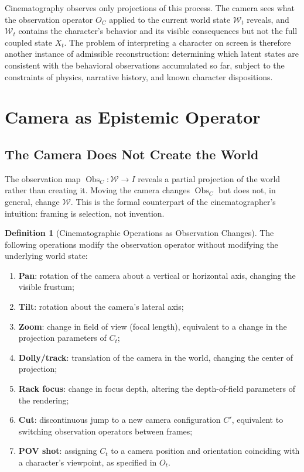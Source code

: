 \documentclass[11pt,a4paper]{article}
\theoremstyle{plain}
\theoremstyle{definition}
\newtheorem{definition}[theorem]{Definition}
\theoremstyle{remark}
\DeclareMathOperator{\Obs}{Obs}
\begin{document}
Cinematography observes only projections of this process. The camera sees what the observation operator $O_C$ applied to the current world state $\mathcal{W}_t$ reveals, and $\mathcal{W}_t$ contains the character's behavior and its visible consequences but not the full coupled state $X_t$. The problem of interpreting a character on screen is therefore another instance of admissible reconstruction: determining which latent states are consistent with the behavioral observations accumulated so far, subject to the constraints of physics, narrative history, and known character dispositions.


\section{Camera as Epistemic Operator}
\label{sec:camera}

\subsection{The Camera Does Not Create the World}

The observation map $\Obs_C : \mathcal{W} \to I$ reveals a partial projection of the world rather than creating it. Moving the camera changes $\Obs_C$ but does not, in general, change $\mathcal{W}$. This is the formal counterpart of the cinematographer's intuition: framing is selection, not invention.

\begin{definition}[Cinematographic Operations as Observation Changes]
The following operations modify the observation operator without modifying the underlying world state:
\begin{enumerate}[leftmargin=2em,itemsep=0pt]
\item \textbf{Pan}: rotation of the camera about a vertical or horizontal axis, changing the visible frustum;
\item \textbf{Tilt}: rotation about the camera's lateral axis;
\item \textbf{Zoom}: change in field of view (focal length), equivalent to a change in the projection parameters of $C_t$;
\item \textbf{Dolly/track}: translation of the camera in the world, changing the center of projection;
\item \textbf{Rack focus}: change in focus depth, altering the depth-of-field parameters of the rendering;
\item \textbf{Cut}: discontinuous jump to a new camera configuration $C'$, equivalent to switching observation operators between frames;
\item \textbf{POV shot}: assigning $C_t$ to a camera position and orientation coinciding with a character's viewpoint, as specified in $O_t$.
\end{enumerate}
\end{definition}
\end{document}
